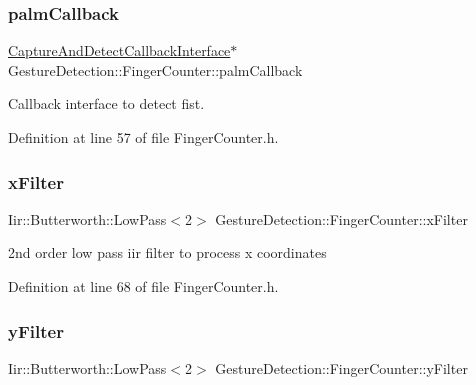 \subsubsection{\texorpdfstring{palm\+Callback}{palmCallback}}
{\footnotesize\ttfamily \hyperlink{class_gestro_1_1_capture_and_detect_callback_interface}{Capture\+And\+Detect\+Callback\+Interface}$\ast$ Gesture\+Detection\+::\+Finger\+Counter\+::palm\+Callback\hspace{0.3cm}{\ttfamily [private]}}



Callback interface to detect fist. 



Definition at line 57 of file Finger\+Counter.\+h.

\mbox{\label{class_gesture_detection_1_1_finger_counter_a4c922ffcb1a2b6232fc2d7715c523c09}} 
\subsubsection{\texorpdfstring{x\+Filter}{xFilter}}
{\footnotesize\ttfamily Iir\+::\+Butterworth\+::\+Low\+Pass$<$2$>$ Gesture\+Detection\+::\+Finger\+Counter\+::x\+Filter\hspace{0.3cm}{\ttfamily [private]}}



2nd order low pass iir filter to process x coordinates 



Definition at line 68 of file Finger\+Counter.\+h.

\mbox{\label{class_gesture_detection_1_1_finger_counter_aaafad0b89fe35e79247270c24988da05}} 
\subsubsection{\texorpdfstring{y\+Filter}{yFilter}}
{\footnotesize\ttfamily Iir\+::\+Butterworth\+::\+Low\+Pass$<$2$>$ Gesture\+Detection\+::\+Finger\+Counter\+::y\+Filter\hspace{0.3cm}{\ttfamily [private]}}



